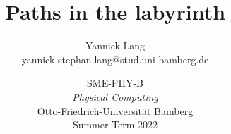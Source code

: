 \documentclass{article}
\title{Paths in the labyrinth}
\author{Yannick Lang\\
    \small yannick-stephan.lang@stud.uni-bamberg.de}
\date{ \vspace{0.5cm} \large 
  SME-PHY-B\\ 
  \emph{Physical Computing} \\ \vspace{0.2cm}
  Otto-Friedrich-Universität Bamberg \\ \vspace{0.2cm}
  Summer Term 2022}
\begin{document}
\newcommand{\IIC}{I\textsuperscript{2}C}

\maketitle












\printbibliography
\end{document}
